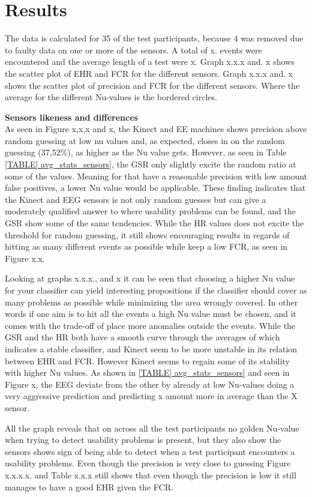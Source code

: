 \section{Results}
The data is calculated for 35 of the test participants, because 4 was removed due to faulty data on one or more of the sensors.	
A total of x. events were encountered and the average length of a test were x.
Graph x.x.x and. x shows the scatter plot of EHR and FCR for the different sensors. 
Graph x.x.x and. x shows the scatter plot of precision and FCR for the different sensors. Where the average for the different Nu-values is the bordered circles.

\textbf{Sensors likeness and differences}\\
As seen in Figure x,x,x and x, the Kinect and EE machines shows precision above random guessing at low nu values and, as expected, closes in on the random guessing (37,52\%), as higher as the Nu value gets. However, as seen in Table \ref{TABLE] avg_stats_sensors}, the GSR only slightly excite the random ratio at some of the values. Meaning for  that have a reasonable precision with low amount false positives, a lower Nu value would be applicable.
These finding indicates that the Kinect and EEG sensors is not only random guesses but can give a moderately qualified answer to where usability problems can be found, and the GSR show some of the same tendencies.
While the HR values does not excite the threshold for random guessing, it still shows encouraging results in regards of hitting as many different events as possible while keep a low FCR, as seen in Figure x.x.

Looking at graphs x.x.x., and x it can be seen that choosing a higher Nu value for your classifier can yield interesting propositions if the classifier should cover as many problems as possible while minimizing the area wrongly covered.
In other words if one aim is to hit all the events a high Nu value must be chosen, and it comes with the trade-off of place more anomalies outside the events. 
While the GSR and the HR both have a smooth curve through the averages of which indicates a stable classifier, and Kinect seem to be more unstable in its relation between EHR and FCR. However Kinect seems to regain some of its stability with higher Nu values. As shown in \ref{TABLE] avg_stats_sensors} and seen in Figure x, the EEG deviate from the other by already at low Nu-values doing a very aggressive prediction and predicting x amount more in average than the X sensor.

All the graph reveals that on across all the test participants no golden Nu-value when trying to detect usability problems is present, but they also show the sensors shows sign of being able to detect when a test participant encounters a usability problems. Even though the precision is very close to guessing  
Figure x.x.x.x. and Table x.x.x still shows that even though the precision is low it still manages to have a good EHR given the FCR.